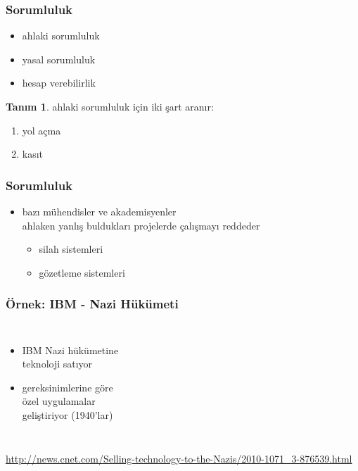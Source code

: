 \documentclass[dvipsnames]{beamer}
\theoremstyle{definition}
\newtheorem{tanim}[theorem]{Tanım}
\theoremstyle{example}
\theoremstyle{plain}
\begin{document}
\begin{frame}
  \frametitle{Sorumluluk}

  \begin{itemize}
    \item ahlaki sorumluluk
    \item yasal sorumluluk

    \medskip
    \item hesap verebilirlik
  \end{itemize}

  \pause
  \begin{tanim}
    ahlaki sorumluluk için iki şart aranır:

    \begin{enumerate}
      \item yol açma
      \item kasıt
    \end{enumerate}
  \end{tanim}
\end{frame}

\begin{frame}
  \frametitle{Sorumluluk}

  \begin{itemize}
    \item bazı mühendisler ve akademisyenler\\
      ahlaken yanlış buldukları projelerde çalışmayı reddeder
    \begin{itemize}
      \item silah sistemleri
      \item gözetleme sistemleri
    \end{itemize}
  \end{itemize}
\end{frame}

\begin{frame}
  \frametitle{Örnek: IBM - Nazi Hükümeti}

  \begin{columns}

    \begin{itemize}
      \item IBM Nazi hükümetine\\
        teknoloji satıyor
      \item gereksinimlerine göre\\
        özel uygulamalar\\
        geliştiriyor (1940'lar)
    \end{itemize}
  \end{columns}

  \medskip
  \tiny{\url{http://news.cnet.com/Selling-technology-to-the-Nazis/2010-1071_3-876539.html}}\\
\end{frame}
\end{document}
